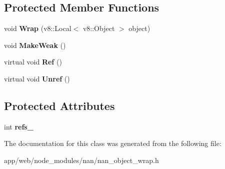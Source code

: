 \subsection*{Protected Member Functions}
\begin{DoxyCompactItemize}
\item 
\mbox{\label{class_object_wrap_a44c379731eead6f31d2a24eec896d363}} 
void {\bfseries Wrap} (v8\+::\+Local$<$ v8\+::\+Object $>$ object)
\item 
\mbox{\label{class_object_wrap_a0f3006d67fdc881ea3ae88d63f097a2f}} 
void {\bfseries Make\+Weak} ()
\item 
\mbox{\label{class_object_wrap_a49d03d43d551a9618222dd462b6cf958}} 
virtual void {\bfseries Ref} ()
\item 
\mbox{\label{class_object_wrap_ac94df5f5a936d7fed7c53c02892c572d}} 
virtual void {\bfseries Unref} ()
\end{DoxyCompactItemize}
\subsection*{Protected Attributes}
\begin{DoxyCompactItemize}
\item 
\mbox{\label{class_object_wrap_af8e7b9962e606a5c8024e0b05e49113b}} 
int {\bfseries refs\+\_\+}
\end{DoxyCompactItemize}


The documentation for this class was generated from the following file\+:\begin{DoxyCompactItemize}
\item 
app/web/node\+\_\+modules/nan/nan\+\_\+object\+\_\+wrap.\+h\end{DoxyCompactItemize}
